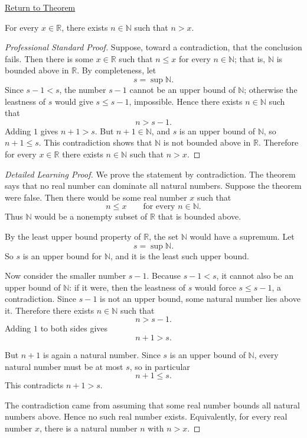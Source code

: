 \newpage
{}
\label{prf:archimedean-property}

\begin{remark*}[Return]
\hyperref[thm:archimedean-property]{Return to Theorem}
\end{remark*}

\begin{theorem*}
For every $x \in \mathbb{R}$, there exists $n \in \mathbb{N}$ such that $n > x$.
\end{theorem*}

\begin{proof}[Professional Standard Proof]
\LRAProofBodyStart
Suppose, toward a contradiction, that the conclusion fails.  Then there is
some $x\in\mathbb{R}$ such that $n\le x$ for every $n\in\mathbb{N}$; that
is, $\mathbb{N}$ is bounded above in $\mathbb{R}$.  By completeness, let
\[
  s=\sup\mathbb{N}.
\]
Since $s-1<s$, the number $s-1$ cannot be an upper bound of $\mathbb{N}$;
otherwise the leastness of $s$ would give $s\le s-1$, impossible.  Hence
there exists $n\in\mathbb{N}$ such that
\[
  n>s-1.
\]
Adding $1$ gives $n+1>s$.  But $n+1\in\mathbb{N}$, and $s$ is an upper bound
of $\mathbb{N}$, so $n+1\le s$.  This contradiction shows that
$\mathbb{N}$ is not bounded above in $\mathbb{R}$.  Therefore for every
$x\in\mathbb{R}$ there exists $n\in\mathbb{N}$ such that $n>x$.
\end{proof}

\begin{proof}[Detailed Learning Proof]
\LRAProofBodyStart
We prove the statement by contradiction.  The theorem says that no real number
can dominate all natural numbers.  Suppose the theorem were false.  Then
there would be some real number $x$ such that
\[
  n\le x
  \qquad\text{for every }n\in\mathbb{N}.
\]
Thus $\mathbb{N}$ would be a nonempty subset of $\mathbb{R}$ that is bounded
above.

By the least upper bound property of $\mathbb{R}$, the set $\mathbb{N}$ would
have a supremum.  Let
\[
  s=\sup\mathbb{N}.
\]
So $s$ is an upper bound for $\mathbb{N}$, and it is the least such upper
bound.

Now consider the smaller number $s-1$.  Because $s-1<s$, it cannot also be an
upper bound of $\mathbb{N}$: if it were, then the leastness of $s$ would force
$s\le s-1$, a contradiction.  Since $s-1$ is not an upper bound, some natural
number lies above it.  Therefore there exists $n\in\mathbb{N}$ such that
\[
  n>s-1.
\]
Adding $1$ to both sides gives
\[
  n+1>s.
\]

But $n+1$ is again a natural number.  Since $s$ is an upper bound of
$\mathbb{N}$, every natural number must be at most $s$, so in particular
\[
  n+1\le s.
\]
This contradicts $n+1>s$.

The contradiction came from assuming that some real number bounds all natural
numbers above.  Hence no such real number exists.  Equivalently, for every
real number $x$, there is a natural number $n$ with $n>x$.
\end{proof}

